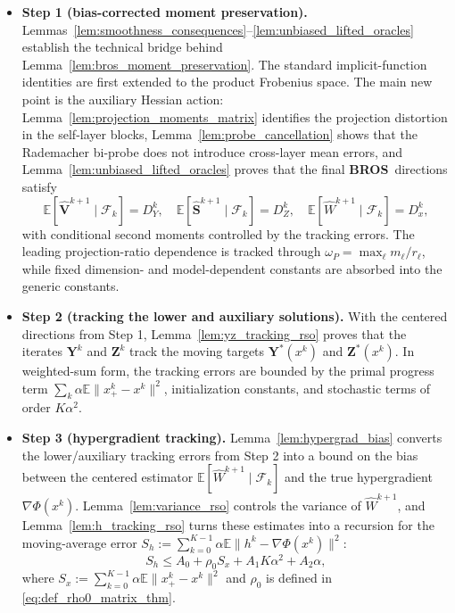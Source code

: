\documentclass{pkumelon}
\theoremstyle{plain}
\newcommand{\E}{\mathbb{E}}
\newcommand{\Phiobj}{\Phi}
\newcommand{\oursname}{\textnormal{\textbf{BROS}}}
\newcommand{\ours}{\oursname\ }
\begin{document}
\begin{itemize}[leftmargin=*]
\item \textbf{Step 1 (bias-corrected moment preservation). } Lemmas~\ref{lem:smoothness_consequences}--\ref{lem:unbiased_lifted_oracles} establish the technical bridge behind Lemma~\ref{lem:bros_moment_preservation}. The standard implicit-function identities are first extended to the product Frobenius space. The main new point is the auxiliary Hessian action: Lemma~\ref{lem:projection_moments_matrix} identifies the projection distortion in the self-layer blocks, Lemma~\ref{lem:probe_cancellation} shows that the Rademacher bi-probe does not introduce cross-layer mean errors, and Lemma~\ref{lem:unbiased_lifted_oracles} proves that the final \ours directions satisfy
\begin{equation*}
\E[\widehat{\boldsymbol V}^{k+1}\mid\mathcal F_k]=D_Y^k,\quad \E[\widehat{\boldsymbol S}^{k+1}\mid\mathcal F_k]=D_Z^k,\quad \E[\widehat W^{k+1}\mid\mathcal F_k]=D_x^k,
\end{equation*}
with conditional second moments controlled by the tracking errors. The leading projection-ratio dependence is tracked through $\omega_P=\max_\ell m_\ell/r_\ell$, while fixed dimension- and model-dependent constants are absorbed into the generic constants.

\item \textbf{Step 2 (tracking the lower and auxiliary solutions). } With the centered directions from Step 1, Lemma~\ref{lem:yz_tracking_rso} proves that the iterates $\boldsymbol Y^k$ and $\boldsymbol Z^k$ track the moving targets $\boldsymbol Y^*(x^k)$ and $\boldsymbol Z^*(x^k)$. In weighted-sum form, the tracking errors are bounded by the primal progress term $\sum_k\alpha\E\|x_+^k-x^k\|^2$, initialization constants, and stochastic terms of order $K\alpha^2$.

\item \textbf{Step 3 (hypergradient tracking). } Lemma~\ref{lem:hypergrad_bias} converts the lower/auxiliary tracking errors from Step 2 into a bound on the bias between the centered estimator $\E[\widehat W^{k+1}\mid\mathcal F_k]$ and the true hypergradient $\nabla\Phiobj(x^k)$. Lemma~\ref{lem:variance_rso} controls the variance of $\widehat W^{k+1}$, and Lemma~\ref{lem:h_tracking_rso} turns these estimates into a recursion for the moving-average error $S_h:=\sum_{k=0}^{K-1}\alpha\E\|h^k-\nabla\Phiobj(x^k)\|^2$:
\begin{equation*}
S_h\le A_0+\rho_0S_x+A_1K\alpha^2+A_2\alpha,
\end{equation*}
where $S_x:=\sum_{k=0}^{K-1}\alpha\E\|x_+^k-x^k\|^2$ and $\rho_0$ is defined in \eqref{eq:def_rho0_matrix_thm}.


\end{itemize}
\end{document}
